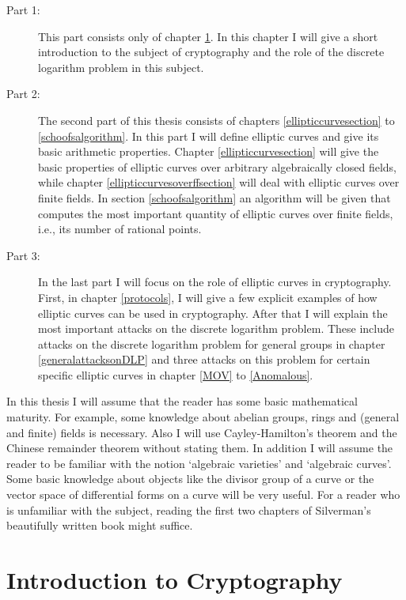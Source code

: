 \documentclass{article}
\numberwithin{equation}{section}
\theoremstyle{definition}
\begin{document}
\begin{description}
\item[Part 1:] This part consists only of chapter \ref{cryptointroduction}. In this chapter I will give a short introduction to the subject of cryptography and the role of the discrete logarithm problem in this subject.
\item[Part 2:] The second part of this thesis consists of chapters \ref{ellipticcurvesection} to \ref{schoofsalgorithm}. In this part I will define elliptic curves and give its basic arithmetic properties. Chapter \ref{ellipticcurvesection} will give the basic properties of elliptic curves over arbitrary algebraically closed fields, while chapter \ref{ellipticcurvesoverffsection} will deal with elliptic curves over finite fields. In section \ref{schoofsalgorithm} an algorithm will be given that computes the most important quantity of elliptic curves over finite fields, i.e., its number of rational points. 
\item[Part 3:] In the last part I will focus on the role of elliptic curves in cryptography. First, in chapter \ref{protocols}, I will give a few explicit examples of how elliptic curves can be used in cryptography. After that I will explain the most important attacks on the discrete logarithm problem. These include attacks on the discrete logarithm problem for general groups in chapter \ref{generalattacksonDLP} and three attacks on this problem for certain specific elliptic curves in chapter \ref{MOV} to \ref{Anomalous}.  
\end{description} 
In this thesis I will assume that the reader has some basic mathematical maturity. For example, some knowledge about abelian groups, rings and (general and finite) fields is necessary. Also I will use Cayley-Hamilton's theorem and the Chinese remainder theorem without stating them. In addition I will assume the reader to be familiar with the notion `algebraic varieties' and `algebraic curves'. Some basic knowledge about objects like the divisor group of a curve or the vector space of differential forms on a curve will be very useful. For a reader who is unfamiliar with the subject, reading the first two chapters of Silverman's beautifully written book \cite{Silverman} might suffice.  




\section{Introduction to Cryptography}\label{cryptointroduction}
\end{document}
